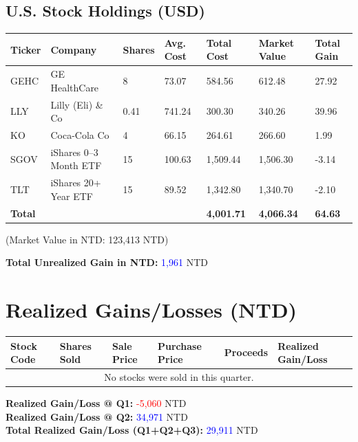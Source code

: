 \documentclass[a4paper,12pt]{article}
\begin{document}
\subsection{U.S. Stock Holdings (USD)}
\begin{longtable}{lllllll}
    \toprule
    Ticker & Company & Shares & Avg. Cost & Total Cost & Market Value & Total Gain \\
    \midrule
    GEHC & GE HealthCare & 8 & 73.07 & 584.56 & 612.48 & 27.92 \\
    LLY  & Lilly (Eli) \& Co              & 0.41 & 741.24 & 300.30 & 340.26 & 39.96 \\
    KO   & Coca-Cola Co                  & 4 & 66.15 & 264.61 & 266.60 & 1.99  \\
    SGOV & iShares 0--3 Month ETF & 15 & 100.63 & 1,509.44 & 1,506.30 & -3.14 \\
    TLT  & iShares 20+ Year ETF & 15 & 89.52 & 1,342.80 & 1,340.70 & -2.10 \\
    \midrule
    \textbf{Total} &      &        &          & \textbf{4,001.71} & \textbf{4,066.34} & \textbf{64.63} \\
    \bottomrule
\end{longtable}
\noindent (Market Value in NTD: 123,413 NTD)

\noindent\textbf{Total Unrealized Gain in NTD:} \textcolor{blue}{1,961} NTD

\section{Realized Gains/Losses (NTD)}
\begin{longtable}{llllll}
    \toprule
    Stock Code & Shares Sold & Sale Price & Purchase Price & Proceeds & Realized Gain/Loss \\
    \midrule
    \multicolumn{6}{c}{No stocks were sold in this quarter.} \\
    \bottomrule
\end{longtable}
\noindent\textbf{Realized Gain/Loss @ Q1:} \textcolor{red}{-5,060} NTD \\
\noindent\textbf{Realized Gain/Loss @ Q2:} \textcolor{blue}{34,971} NTD \\
\noindent\textbf{Total Realized Gain/Loss (Q1+Q2+Q3):} \textcolor{blue}{29,911} NTD
\end{document}
